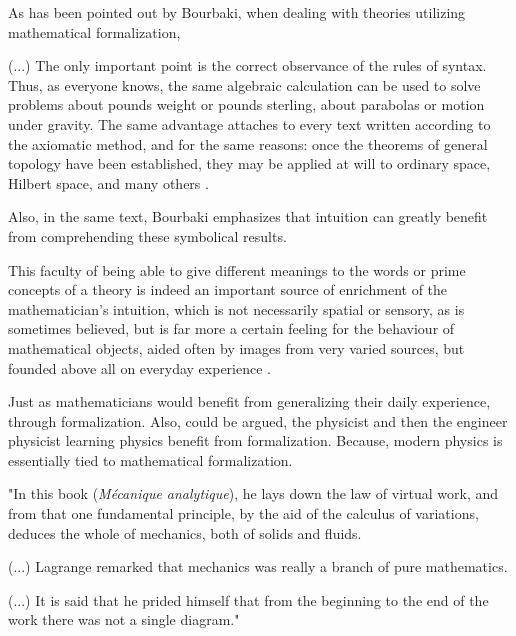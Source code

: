 \documentclass[
12pt,				%
openright,			%
oneside,			%
a4paper,			%
brazil,				%
english,			%
]{abntex2}
\begin{document}
As has been pointed out by Bourbaki, when dealing with theories
utilizing mathematical formalization,

\begin{citacao}
  (...) The only important point is the correct observance of the rules
  of syntax. Thus, as everyone knows, the same algebraic calculation can
  be used to solve problems about pounds  weight or pounds sterling,
  about parabolas or motion under gravity. The same advantage attaches
  to every text written according to the axiomatic method, and for the
  same reasons: once the theorems of general topology have been
  established, they may be applied at will to ordinary space, Hilbert
  space, and many others \cite{bourbaki2004theory}.
\end{citacao}

Also, in the same text, Bourbaki emphasizes that intuition can greatly
benefit from comprehending these symbolical results.  

\begin{citacao}
 This faculty of being able to give
 different meanings to the words or prime concepts of a theory is indeed an
 important source of enrichment of the mathematician's intuition, which is
 not necessarily spatial or sensory, as is sometimes believed, but is far more
 a certain feeling for the behaviour of mathematical objects, aided often
 by images from very varied sources, but founded above all on everyday
 experience \cite{bourbaki2004theory}.
\end{citacao}

Just as mathematicians would benefit from generalizing their daily
experience, through formalization. Also, could be argued, the
physicist and then the engineer physicist learning physics benefit
from formalization. Because, modern physics is essentially tied to
mathematical formalization.

\begin{citacao}
"In this book (\textit{Mécanique analytique}), he lays down the law of
virtual work, and from that one fundamental principle, by the aid of
the calculus of variations, deduces the whole of mechanics, both of solids and fluids.

(...) Lagrange remarked that mechanics was really a branch of pure mathematics.

(...) It is said that he prided himself that from the beginning to the
end of the work there was not a single diagram." \cite{panza2003origins}
\end{citacao}
\end{document}
